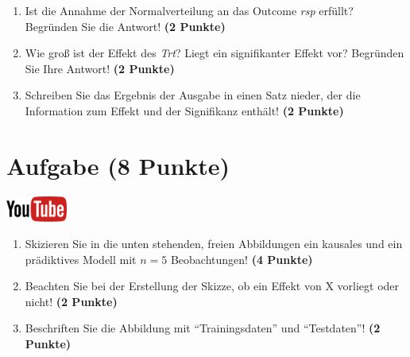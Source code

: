 \documentclass[a4paper, 10pt]{scrartcl}\usepackage[]{graphicx}\usepackage[]{xcolor}
\begin{document}
\begin{enumerate}
\item Ist die Annahme der Normalverteilung an das Outcome \textit{rsp} erf{\"u}llt?
  Begr{\"u}nden Sie die Antwort! \textbf{(2 Punkte)}
\item Wie gro{\ss} ist der Effekt des \textit{Trt}? Liegt ein signifikanter
  Effekt vor? Begr{\"u}nden Sie Ihre Antwort! \textbf{(2 Punkte)}
\item Schreiben Sie das Ergebnis der \Rlogo Ausgabe in einen Satz nieder, der die
  Information zum Effekt und der Signifikanz enth{\"a}lt! \textbf{(2 Punkte)} 
\end{enumerate}
 
\clearpage

\section{Aufgabe \hfill (8 Punkte)}

\hfill\href{https://youtu.be/C_a8aOMI7GE}{\includegraphics[width =
  2cm]{img/youtube}}\\[1Ex]



\begin{enumerate}
\item Skizieren Sie in die unten stehenden, freien Abbildungen ein kausales
  und ein pr{\"a}diktives Modell mit $n = 5$
  Beobachtungen! \textbf{(4 Punkte)}
\item Beachten Sie bei der Erstellung der Skizze, ob ein Effekt von X
  vorliegt oder nicht! \textbf{(2 Punkte)}
\item Beschriften Sie die Abbildung mit "`Trainingsdaten"' und "`Testdaten"'!  \textbf{(2 Punkte)}
\end{enumerate}
\end{document}
